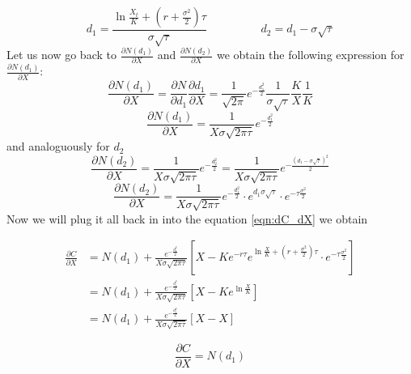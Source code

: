 \documentclass[times, utf8, diplomski]{fer}
\begin{document}
\begin{equation*}
	d_1 = \frac{\ln{\frac{X_t}{K}} + \left(r + \frac{\sigma^2}{2} \right)\tau}{\sigma\sqrt{\tau}} \hspace{2cm} d_2 = d_1 - \sigma\sqrt{\tau}
\end{equation*} Let us now go back to $\frac{\partial N(d_1)}{\partial X}$ and $\frac{\partial N(d_2)}{\partial X}$ we obtain the following expression for $\frac{\partial N(d_1)}{\partial X}$:
\begin{equation*}
	\frac{\partial N(d_1)}{\partial X} = \frac{\partial N}{\partial d_1} \frac{\partial d_1}{\partial X} = \frac{1}{\sqrt{2\pi}}e^{-\frac{d_1^2}{2}}\frac{1}{\sigma\sqrt{\tau}}\frac{K}{X}\frac{1}{K}
\end{equation*}
\begin{equation}
	\frac{\partial N(d_1)}{\partial X} = \frac{1}{X\sigma\sqrt{2\pi\tau}}e^{-\frac{d_1^2}{2}}
\end{equation} and analoguously for $d_2$
\begin{equation*}
	\frac{\partial N(d_2)}{\partial X} = \frac{1}{X\sigma\sqrt{2\pi\tau}}e^{-\frac{d_2^2}{2}} = \frac{1}{X\sigma\sqrt{2\pi\tau}}e^{-\frac{(d_1 - \sigma\sqrt{\tau})^2}{2}}
\end{equation*}
\begin{equation}
	\frac{\partial N(d_2)}{\partial X} = \frac{1}{X\sigma\sqrt{2\pi\tau}}e^{-\frac{d_1^2}{2}} \cdot e^{d_1\sigma\sqrt{\tau}} \cdot e^{-\tau\frac{\sigma^2}{2}}
\end{equation} Now we will plug it all back in into the equation \ref{eqn:dC_dX} we obtain

\begin{align*}
	\frac{\partial C}{\partial X} &= N(d_1) + \frac{e^{-\frac{d_1^2}{2}}}{X\sigma\sqrt{2\pi\tau}} \left[ X - Ke^{-r\tau} e^{\ln{\frac{X}{K}} + (r+\frac{\sigma^2}{2})\tau} \cdot e^{-\tau\frac{\sigma^2}{2}} \right] \\
	&= N(d_1) + \frac{e^{-\frac{d_1^2}{2}}}{X\sigma\sqrt{2\pi\tau}} \left[ X - Ke^{\ln{\frac{X}{K}}} \right] \\
	&= N(d_1) + \frac{e^{-\frac{d_1^2}{2}}}{X\sigma\sqrt{2\pi\tau}} \left[ X - X \right]
\end{align*}

\begin{equation}
	\boxed{
		\frac{\partial C}{\partial X} = N(d_1)
	}
\end{equation}
\end{document}
